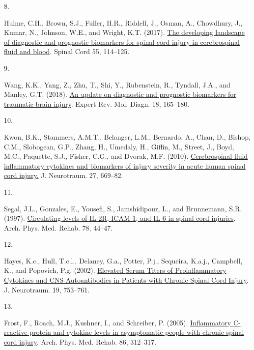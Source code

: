 \documentclass[
]{article}
\newlength{\cslhangindent}
\newlength{\csllabelwidth}
\newlength{\cslentryspacingunit} %
\newenvironment{CSLReferences}[2] %
 {%
  \setlength{\parindent}{0pt}
  \ifodd #1
  \let\oldpar\par
  \def\par{\hangindent=\cslhangindent\oldpar}
  \fi
  \setlength{\parskip}{#2\cslentryspacingunit}
 }%
 {}
\newcommand{\CSLLeftMargin}[1]{\parbox[t]{\csllabelwidth}{#1}}
\newcommand{\CSLRightInline}[1]{\parbox[t]{\linewidth - \csllabelwidth}{#1}\break}
\begin{document}
\begin{CSLReferences}{0}{0}
\leavevmode{}%
\CSLLeftMargin{8. }
\CSLRightInline{Hulme, C.H., Brown, S.J., Fuller, H.R., Riddell, J., Osman, A., Chowdhury, J., Kumar, N., Johnson, W.E., and Wright, K.T. (2017). \href{https://doi.org/10.1038/sc.2016.174}{The developing landscape of diagnostic and prognostic biomarkers for spinal cord injury in cerebrospinal fluid and blood}. Spinal Cord 55, 114--125.}

\leavevmode{}%
\CSLLeftMargin{9. }
\CSLRightInline{Wang, K.K., Yang, Z., Zhu, T., Shi, Y., Rubenstein, R., Tyndall, J.A., and Manley, G.T. (2018). \href{https://doi.org/10.1080/14737159.2018.1428089}{An update on diagnostic and prognostic biomarkers for traumatic brain injury}. Expert Rev. Mol. Diagn. 18, 165--180.}

\leavevmode{}%
\CSLLeftMargin{10. }
\CSLRightInline{Kwon, B.K., Stammers, A.M.T., Belanger, L.M., Bernardo, A., Chan, D., Bishop, C.M., Slobogean, G.P., Zhang, H., Umedaly, H., Giffin, M., Street, J., Boyd, M.C., Paquette, S.J., Fisher, C.G., and Dvorak, M.F. (2010). \href{https://doi.org/10.1089/neu.2009.1080}{Cerebrospinal fluid inflammatory cytokines and biomarkers of injury severity in acute human spinal cord injury.} J. Neurotraum. 27, 669--82.}

\leavevmode{}%
\CSLLeftMargin{11. }
\CSLRightInline{Segal, J.L., Gonzales, E., Yousefi, S., Jamshidipour, L., and Brunnemann, S.R. (1997). \href{https://doi.org/10.1016/s0003-9993(97)90008-3}{Circulating levels of {IL-2R}, {ICAM-1}, and {IL-6} in spinal cord injuries}. Arch. Phys. Med. Rehab. 78, 44--47.}

\leavevmode{}%
\CSLLeftMargin{12. }
\CSLRightInline{Hayes, K.c., Hull, T.c.l., Delaney, G.a., Potter, P.j., Sequeira, K.a.j., Campbell, K., and Popovich, P.g. (2002). \href{https://doi.org/10.1089/08977150260139129}{Elevated {Serum Titers} of {Proinflammatory Cytokines} and {CNS Autoantibodies} in {Patients} with {Chronic Spinal Cord Injury}}. J. Neurotraum. 19, 753--761.}

\leavevmode{}%
\CSLLeftMargin{13. }
\CSLRightInline{Frost, F., Roach, M.J., Kushner, I., and Schreiber, P. (2005). \href{https://doi.org/10.1016/j.apmr.2004.02.009}{Inflammatory {C-reactive} protein and cytokine levels in asymptomatic people with chronic spinal cord injury}. Arch. Phys. Med. Rehab. 86, 312--317.}


\end{CSLReferences}
\end{document}
